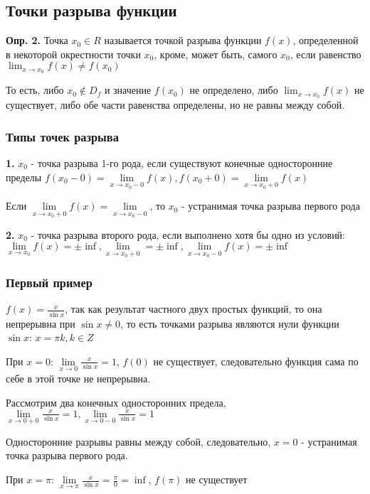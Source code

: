 \documentclass{article}
\begin{document}
\subsection{Точки разрыва функции}

\textbf{Опр. 2.} Точка $x_0 \in R$ называется точкой разрыва функции $f(x)$, определенной в некоторой окрестности точки $x_0$, кроме, может быть, самого $x_0$, если равенство $\lim_{x \to x_0} f(x) \ne f(x_0)$

То есть, либо $x_0 \notin D_f$ и значение $f(x_0)$ не определено, либо $\lim_{x \to x_0} f(x)$ не существует, либо обе части равенства определены, но не равны между собой.

\subsubsection{Типы точек разрыва}

\textbf{1.} $x_0$ - точка разрыва 1-го рода, если существуют конечные односторонние пределы $f(x_0 - 0) = \lim\limits_{x \to x_0 - 0} f(x), f(x_0 + 0) = \lim\limits_{x \to x_0 + 0} f(x)$

Если $\lim\limits_{x \to x_0 + 0} f(x) = \lim\limits_{x \to x_0 - 0}$, то $x_0$ - устранимая точка разрыва первого рода

\textbf{2.} $x_0$ - точка разрыва второго рода, если выполнено хотя бы одно из условий: $\lim\limits_{x \to x_0} f(x) = \pm \inf, \lim\limits_{x \to x_0 + 0} = \pm \inf, \lim\limits_{x \to x_0-0} f(x) = \pm \inf$

\subsubsection{Первый пример}

$f(x) = \frac{x}{\sin x}$, так как результат частного двух простых функций, то она непрерывна при $\sin x \ne 0$, то есть точками разрыва являются нули функции $\sin x$: $x = \pi k, k \in Z$

При $x = 0$: $\lim\limits_{x \to 0} \frac{x}{\sin x} = 1$, $f(0)$ не существует, следовательно функция сама по себе в этой точке не непрерывна.

Рассмотрим два конечных односторонних предела, $\lim\limits_{x \to 0 + 0} \frac{x}{\sin x} = 1, \lim\limits_{x \to 0 - 0} \frac{x}{\sin x} = 1$

Односторонние разрывы равны между собой, следовательно, $x = 0$ - устранимая точка разрыва первого рода.

При $x = \pi$: $\lim\limits_{x \to \pi} \frac{x}{\sin x} = \frac{\pi}{0} = \inf$, $f(\pi)$ не существует
\end{document}
